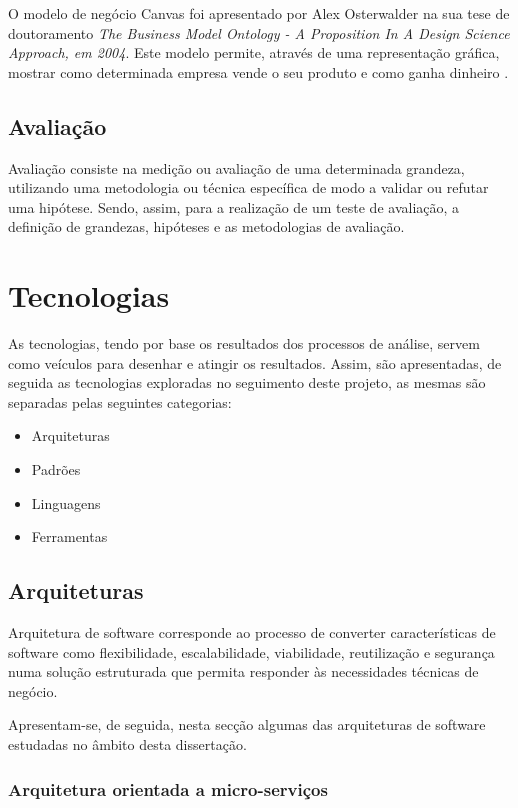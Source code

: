 O modelo de negócio Canvas foi apresentado por Alex Osterwalder na sua tese de doutoramento \emph{The Business Model Ontology - A Proposition In A Design Science Approach, em 2004}. Este modelo permite, através de uma representação gráfica, mostrar como determinada empresa vende o seu produto  e como ganha dinheiro \cite{canvas}.

\subsection{Avaliação \label{estado_arte_avaliacao}}
Avaliação consiste na medição ou avaliação de uma determinada grandeza, utilizando uma metodologia ou técnica específica de modo a validar ou refutar uma hipótese. Sendo, assim, para a realização de um teste de avaliação, a definição de grandezas, hipóteses e as metodologias de avaliação\cite{experimentation_principles}.

\section{Tecnologias}
As tecnologias, tendo por base os resultados dos processos de análise, servem como veículos para desenhar e atingir os resultados. Assim, são apresentadas, de seguida as tecnologias exploradas no seguimento deste projeto, as mesmas são separadas pelas seguintes categorias:
\begin{itemize}
    \item Arquiteturas
    \item Padrões
    \item Linguagens
    \item Ferramentas
\end{itemize}

\subsection{Arquiteturas}
Arquitetura de software corresponde ao processo de converter características de software como flexibilidade, escalabilidade, viabilidade, reutilização e segurança numa solução estruturada que permita responder às necessidades técnicas de negócio\cite{software_architecture}.

Apresentam-se, de seguida, nesta secção algumas das arquiteturas de software estudadas no âmbito desta dissertação.

\subsubsection{Arquitetura orientada a micro-serviços}

